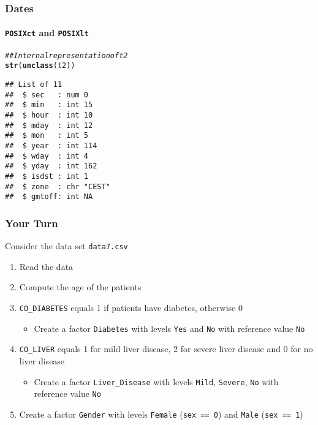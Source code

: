 \documentclass[paper=screen,mathserif]{beamer}\usepackage[]{graphicx}\usepackage[]{color}
\makeatletter
\newcommand{\hlcom}[1]{\textcolor[rgb]{0.678,0.584,0.686}{\textit{#1}}}%
\newcommand{\hlstd}[1]{\textcolor[rgb]{0.345,0.345,0.345}{#1}}%
\newcommand{\hlkwd}[1]{\textcolor[rgb]{0.737,0.353,0.396}{\textbf{#1}}}%
\newenvironment{kframe}{%
 \def\at@end@of@kframe{}%
 \ifinner\ifhmode%
  \def\at@end@of@kframe{\end{minipage}}%
  \begin{minipage}{\columnwidth}%
 \fi\fi%
 \def\FrameCommand##1{\hskip\@totalleftmargin \hskip-\fboxsep
 \colorbox{shadecolor}{##1}\hskip-\fboxsep
     \hskip-\linewidth \hskip-\@totalleftmargin \hskip\columnwidth}%
 \MakeFramed {\advance\hsize-\width
   \@totalleftmargin\z@ \linewidth\hsize
   \@setminipage}}%
 {\par\unskip\endMakeFramed%
 \at@end@of@kframe}
\newenvironment{knitrout}{}{} %
\newcommand{\ft}[1]{\frametitle{#1}}
\newcommand{\fst}[1]{\framesubtitle{#1}}
\makeatother
\begin{document}
\begin{frame}[fragile]
  \ft{Dates}
  \fst{{\tt POSIXct} and {\tt POSIXlt}}
\begin{knitrout}\scriptsize
{}\color{fgcolor}\begin{kframe}
\begin{alltt}
\hlcom{## Internal representation of t2}
\hlkwd{str}\hlstd{(}\hlkwd{unclass}\hlstd{(t2))}
\end{alltt}
\begin{verbatim}
## List of 11
##  $ sec   : num 0
##  $ min   : int 15
##  $ hour  : int 10
##  $ mday  : int 12
##  $ mon   : int 5
##  $ year  : int 114
##  $ wday  : int 4
##  $ yday  : int 162
##  $ isdst : int 1
##  $ zone  : chr "CEST"
##  $ gmtoff: int NA
\end{verbatim}
\end{kframe}
\end{knitrout}
\end{frame}

\begin{frame}[fragile]
  \ft{Your Turn}
  
  Consider the data set {\tt data7.csv}
  \begin{enumerate}
  \item Read the data
  \item Compute the age of the patients
  \item \verb=CO_DIABETES= equals 1 if patients have diabetes,
    otherwise 0
    \begin{itemize}
    \item Create a factor {\tt Diabetes} with levels {\tt Yes} and
      {\tt No} with reference value {\tt No}
    \end{itemize}
  \item \verb=CO_LIVER= equals 1 for mild liver disease, 2 for
    severe liver disease and 0 for no liver disease
    \begin{itemize}
    \item Create a factor \verb=Liver_Disease= with levels
      \verb=Mild=, \verb=Severe=, \verb=No= with reference value
      \verb=No= 
    \end{itemize}
  \item Create a factor \verb=Gender= with levels \verb=Female=
    (\verb|sex == 0|) and \verb=Male= (\verb|sex == 1|)

  \end{enumerate}

  
\end{frame}
\end{document}
